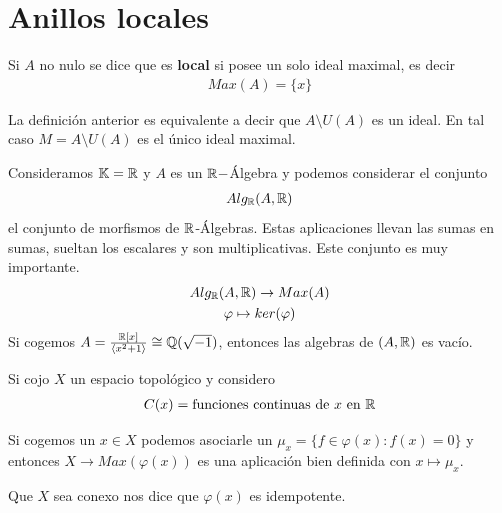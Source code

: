 \section{Anillos locales}

\begin{definicion}
    Si $A$ no nulo se dice que es \textbf{local} si posee un solo ideal maximal, es decir
    \begin{gather*}
        Max(A) = \{x\}
    \end{gather*}
\end{definicion}

\begin{prop}
    La definición anterior es equivalente a decir que $A\setminus U(A)$ es un ideal. En tal caso $M=A\setminus U(A)$ es el único ideal maximal.

\end{prop}

Consideramos $\mathbb{K} = \mathbb{R}$ y $A$ es un $\mathbb{R}-$Álgebra
y podemos considerar el conjunto
\begin{gather*}
    Alg_{\mathbb{R}}(A, \mathbb{R})
\end{gather*}
el conjunto de morfismos de $\mathbb{R}$-Álgebras. Estas aplicaciones llevan las sumas en sumas, sueltan los escalares y son multiplicativas. Este conjunto es muy importante.
\begin{gather*}
    Alg_{\mathbb{R}}(A, \mathbb{R}) \to Max(A)\\
    \varphi \mapsto ker(\varphi)
\end{gather*}
Si cogemos $A = \frac{\mathbb{R}[x]}{\langle x^2 + 1 \rangle} \cong \mathbb{Q}(\sqrt{-1})$, entonces las algebras de $(A, \mathbb{R})$ es vacío.

Si cojo $X$ un espacio topológico y considero 
\begin{gather*}
    C(x) = \text{funciones continuas de $x$ en $\mathbb{R}$}
\end{gather*}

Si cogemos un $x\in X$ podemos asociarle un $\mu_x = \{f \in \varphi(x) : f(x)=0\}$ y entonces $X\to Max(\varphi(x))$ es una aplicación bien definida con $x\mapsto \mu_x$.

Que $X$ sea conexo nos dice que $\varphi(x)$ es idempotente.\\

